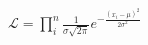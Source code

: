 \documentclass[convert={density=400,outext=.png}]{standalone}
\begin{document}
\pagecolor{almost-white}


$\displaystyle
\mathcal{L}=\prod_i^n \frac{1}{\sigma \sqrt{2\pi}} e^{-\frac{(x_i-\mu)^2}{2\sigma^2}}
$
\end{document}
